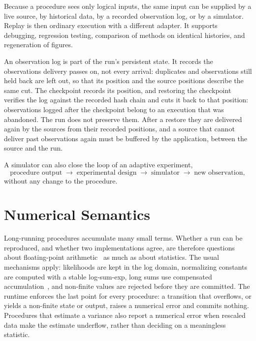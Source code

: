 \documentclass[11pt,a4paper]{article}
\theoremstyle{definition}
\theoremstyle{remark}
\begin{document}
Because a procedure sees only logical inputs, the same input can be
supplied by a live source, by historical data, by a recorded
observation log, or by a simulator. Replay is then ordinary execution with a
different adapter. It supports debugging, regression testing, comparison
of methods on identical histories, and regeneration of figures.

An observation log is part of the run's persistent state. It records
the observations delivery passes on, not every arrival: duplicates and
observations still held back are left out, so that its position and the
source positions describe the same cut. The checkpoint
records its position, and restoring the checkpoint verifies the log
against the recorded hash chain and cuts it back to that position:
observations logged after the checkpoint belong to an execution that
was abandoned. The run does not preserve them. After a restore they are
delivered again by the sources from their recorded positions, and a
source that cannot deliver past observations again must be buffered by
the application, between the source and the run.

A simulator can also close the loop of an adaptive experiment,
\[
\text{procedure output}
\;\longrightarrow\;
\text{experimental design}
\;\longrightarrow\;
\text{simulator}
\;\longrightarrow\;
\text{new observation},
\]
without any change to the procedure.

\section{Numerical Semantics}
\label{sec:numerical}

Long-running procedures accumulate many small terms. Whether a run can
be reproduced, and whether two implementations agree, are therefore
questions about floating-point
arithmetic~\cite{goldberg1991,higham2002} as much as about statistics.
The usual mechanisms apply: likelihoods are kept in the log domain,
normalizing constants are computed with a stable log-sum-exp, long sums
use compensated accumulation~\cite{kahan1965,neumaier1974}, and
non-finite values are rejected before they are committed. The runtime
enforces the last point for every procedure: a transition that
overflows, or yields a non-finite state or output, raises a numerical
error and commits nothing. Procedures that estimate a variance also
report a numerical error when rescaled data make the estimate
underflow, rather than deciding on a meaningless statistic.
\end{document}
